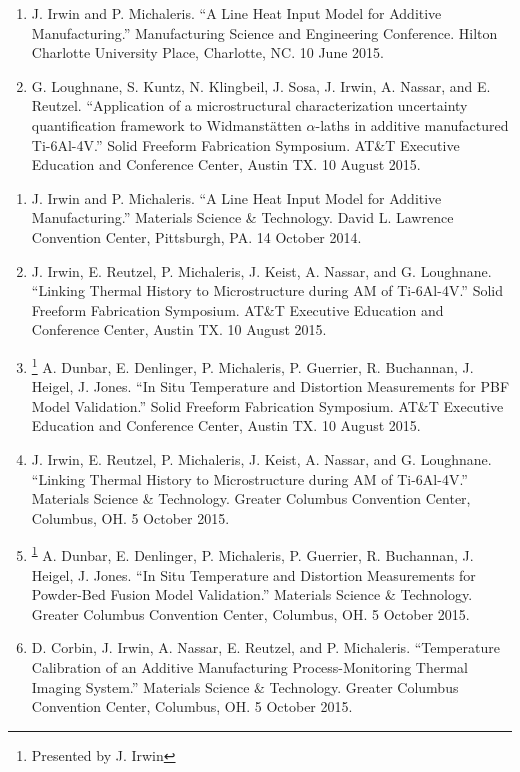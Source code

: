 \documentclass[10.5pt,letterpaper]{article}
\begin{document}
\spacedhrule{0.5em}{-0.5em}
\begin{enumerate}[leftmargin=*]
	\setlength{\parskip}{0em}
	\item J. Irwin and P. Michaleris. ``A Line Heat Input Model for Additive Manufacturing.'' Manufacturing Science and Engineering Conference. Hilton Charlotte University Place, Charlotte, NC. 10 June 2015.
	\item G. Loughnane, S. Kuntz, N. Klingbeil, J. Sosa, J. Irwin, A. Nassar, and E. Reutzel. ``Application of a microstructural characterization uncertainty quantification framework to Widmanst\"atten $\alpha$-laths in additive manufactured Ti-6Al-4V.'' Solid Freeform Fabrication Symposium. AT\&T Executive Education and Conference Center, Austin TX. 10 August 2015.
\end{enumerate}

\begin{enumerate}[leftmargin=*]
	\setlength{\parskip}{0em}
	\item J. Irwin and P. Michaleris. ``A Line Heat Input Model for Additive Manufacturing.'' Materials Science \& Technology. David L. Lawrence Convention Center, Pittsburgh, PA. 14 October 2014.
	\item J. Irwin, E. Reutzel, P. Michaleris, J. Keist, A. Nassar, and G. Loughnane. ``Linking Thermal History to Microstructure during AM of Ti-6Al-4V.'' Solid Freeform Fabrication Symposium. AT\&T Executive Education and Conference Center, Austin TX. 10 August 2015.
	\item \footnote{\label{note1}Presented by J. Irwin} A. Dunbar, E. Denlinger, P. Michaleris, P. Guerrier, R. Buchannan, J. Heigel, J. Jones. ``In Situ Temperature and Distortion Measurements for PBF Model Validation.'' Solid Freeform Fabrication Symposium. AT\&T Executive Education and Conference Center, Austin TX. 10 August 2015.
	\item J. Irwin, E. Reutzel, P. Michaleris, J. Keist, A. Nassar, and G. Loughnane. ``Linking Thermal History to Microstructure during AM of Ti-6Al-4V.'' Materials Science \& Technology. Greater Columbus Convention Center, Columbus, OH. 5 October 2015.
	\item \textsuperscript{\ref{note1}} A. Dunbar, E. Denlinger, P. Michaleris, P. Guerrier, R. Buchannan, J. Heigel, J. Jones. ``In Situ Temperature and Distortion Measurements for Powder-Bed Fusion Model Validation.'' Materials Science \& Technology. Greater Columbus Convention Center, Columbus, OH. 5 October 2015.
	\item D. Corbin, J. Irwin, A. Nassar, E. Reutzel, and P. Michaleris. ``Temperature Calibration of an Additive Manufacturing Process-Monitoring Thermal Imaging System.'' Materials Science \& Technology. Greater Columbus Convention Center, Columbus, OH. 5 October 2015.
\end{enumerate}
\end{document}

